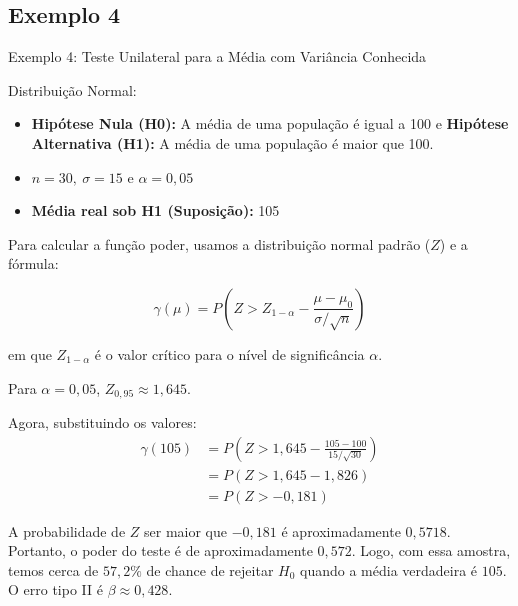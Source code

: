 \documentclass[12pt]{beamer}
\begin{document}
\subsection{Exemplo 4}
\begin{frame}{Exemplo 4: Teste Unilateral para a Média com Variância Conhecida}
\begin{block}{Distribuição Normal:}
\justifying

\begin{itemize}
\item \textbf{Hipótese Nula (H0):} A média de uma população é igual a 100 e \textbf{Hipótese Alternativa (H1):} A média de uma população é maior que 100.
\item $n=30,~\sigma=15$ e $\alpha=0,05$
\item \textbf{Média real sob H1 (Suposição):} 105
\end{itemize}

Para calcular a função poder, usamos a distribuição normal padrão ($Z$) e a fórmula:

\[ \gamma(\mu) = P(Z > Z_{1-\alpha} - \frac{\mu - \mu_0}{\sigma/\sqrt{n}}) \]

em que $Z_{1-\alpha}$ é o valor crítico para o nível de significância $\alpha$.
\end{block}
\end{frame}

\begin{frame}{}
\begin{block}{}
\justifying
Para $\alpha = 0,05$, $Z_{0,95} \approx 1,645.$

Agora, substituindo os valores:
\begin{align*}
    \gamma(105) &= P(Z > 1,645 - \frac{105 - 100}{15/\sqrt{30}})\\
    &= P(Z > 1,645 - 1,826)\\
    &= P(Z > -0,181)
\end{align*}

A probabilidade de $Z$ ser maior que $-0,181$ é aproximadamente $0,5718$. Portanto, o poder do teste é de aproximadamente $0,572$. Logo, com essa amostra, temos cerca de $57{,}2\%$ de chance de rejeitar $H_0$ quando a média verdadeira é $105$. O erro tipo II é $\beta \approx 0{,}428$.

\end{block}
\end{frame}
\end{document}
